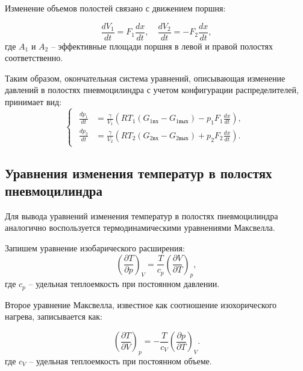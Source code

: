 Изменение объемов полостей связано с движением поршня:

\begin{equation*}
    \frac{dV_1}{dt} = F_1\frac{dx}{dt}, \quad \frac{dV_2}{dt} = -F_2\frac{dx}{dt},
\end{equation*}
где $A_1$ и $A_2$ -- эффективные площади поршня в левой и правой полостях соответственно.

Таким образом, окончательная система уравнений, описывающая изменение
давлений в полостях пневмоцилиндра с учетом конфигурации распределителей, принимает вид:
\begin{equation}\label{eq:ch2/eq_pressure_system}
    \begin{cases}
        \begin{aligned}
            \frac{dp_1}{dt} & = \frac{\gamma}{V_1}\left(RT_1(G_{1\text{вх}} - G_{1\text{вых}}) - p_1 F_1\frac{dx}{dt}\right), \\
            \frac{dp_2}{dt} & = \frac{\gamma}{V_2}\left(RT_2(G_{2\text{вх}} - G_{2\text{вых}}) + p_2 F_2\frac{dx}{dt}\right).
        \end{aligned}
    \end{cases}
\end{equation}

\subsection{Уравнения изменения температур в полостях пневмоцилиндра}\label{sec:ch2/sec2/subsec3}

Для вывода уравнений изменения температур в полостях пневмоцилиндра аналогично воспользуется
термодинамическими уравнениями Максвелла.

Запишем уравнение изобарического расширения:
\begin{equation*}
    \left(\frac{\partial T}{\partial p}\right)_V = \frac{T}{c_p} \left(\frac{\partial V}{\partial T}\right)_p,
\end{equation*}
где  $c_p$ -- удельная теплоемкость при постоянном давлении.

Второе уравнение Максвелла, известное как соотношение изохорического нагрева, записывается как:

\begin{equation*}
    \left(\frac{\partial T}{\partial V}\right)_p = -\frac{T}{c_V} \left(\frac{\partial p}{\partial T}\right)_V.
\end{equation*}
где $c_V$ -- удельная теплоемкость при постоянном объеме.

